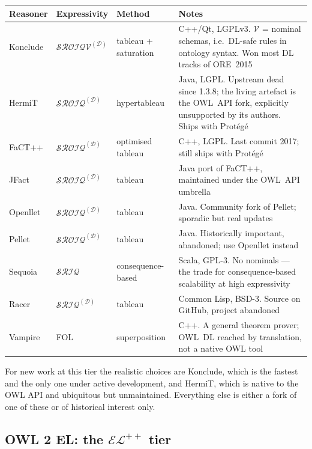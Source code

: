 \documentclass[11pt,a4paper]{article}
\newcommand{\dl}[1]{\ensuremath{\mathcal{#1}}}
\newcommand{\EL}{\dl{EL}}
\newcommand{\SROIQ}{\dl{SROIQ}}
\begin{document}
\begin{table}[h]
\centering
\footnotesize
\begin{tabular}{@{}lllp{4.5cm}@{}}
\toprule
\textbf{Reasoner} & \textbf{Expressivity} & \textbf{Method} & \textbf{Notes}\\
\midrule
Konclude & $\SROIQ\mathcal{V}^{(\mathcal{D})}$ & tableau + saturation
  & C++/Qt, LGPLv3. $\mathcal{V}$ = nominal schemas, i.e.\ DL-safe rules in
    ontology syntax. Won most DL tracks of ORE~2015\\
HermiT & $\SROIQ^{(\mathcal{D})}$ & hypertableau
  & Java, LGPL. Upstream dead since 1.3.8; the living artefact is the OWL~API
    fork, explicitly unsupported by its authors. Ships with Prot\'eg\'e\\
FaCT++ & $\SROIQ^{(\mathcal{D})}$ & optimised tableau
  & C++, LGPL. Last commit 2017; still ships with Prot\'eg\'e\\
JFact & $\SROIQ^{(\mathcal{D})}$ & tableau
  & Java port of FaCT++, maintained under the OWL~API umbrella\\
Openllet & $\SROIQ^{(\mathcal{D})}$ & tableau
  & Java. Community fork of Pellet; sporadic but real updates\\
Pellet & $\SROIQ^{(\mathcal{D})}$ & tableau
  & Java. Historically important, abandoned; use Openllet instead\\
Sequoia & $\dl{SRIQ}$ & consequence-based
  & Scala, GPL-3. No nominals --- the trade for consequence-based
    scalability at high expressivity\\
Racer & $\dl{SRIQ}^{(\mathcal{D})}$ & tableau
  & Common Lisp, BSD-3. Source on GitHub, project abandoned\\
Vampire & FOL & superposition
  & C++. A general theorem prover; OWL~DL reached by translation, not a
    native OWL tool\\
\bottomrule
\end{tabular}
\end{table}

\noindent
For new work at this tier the realistic choices are Konclude, which is the
fastest and the only one under active development, and HermiT, which is native
to the OWL API and ubiquitous but unmaintained. Everything else is either a
fork of one of these or of historical interest only.

\subsection*{OWL 2 EL: the $\EL^{++}$ tier}
\end{document}
